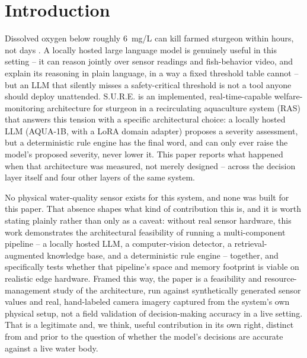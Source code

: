 \section{Introduction}
\label{sec:introduction}

Dissolved oxygen below roughly 6~mg/L can kill farmed sturgeon within hours, not days
\citep{lindholm2023waterquality,agmrc2026waterquality}. A locally hosted large language model is
genuinely useful in this setting -- it can reason jointly over sensor readings and fish-behavior
video, and explain its reasoning in plain language, in a way a fixed threshold table cannot -- but
an LLM that silently misses a safety-critical threshold is not a tool anyone should deploy
unattended. S.U.R.E. is an implemented, real-time-capable welfare-monitoring architecture for
sturgeon in a recirculating aquaculture system (RAS) that answers this tension with a specific
architectural choice: a locally hosted LLM (AQUA-1B, with a LoRA domain adapter) proposes a severity
assessment, but a deterministic rule engine has the final word, and can only ever raise the model's
proposed severity, never lower it. This paper reports what happened when that architecture was
measured, not merely designed -- across the decision layer itself and four other layers of the same
system.

No physical water-quality sensor exists for this system, and none was built for this paper. That
absence shapes what kind of contribution this is, and it is worth stating plainly rather than only
as a caveat: without real sensor hardware, this work demonstrates the architectural feasibility of
running a multi-component pipeline -- a locally hosted LLM, a computer-vision detector, a
retrieval-augmented knowledge base, and a deterministic rule engine -- together, and specifically
tests whether that pipeline's space and memory footprint is viable on realistic edge hardware. Framed
this way, the paper is a feasibility and resource-management study of the architecture, run against
synthetically generated sensor values and real, hand-labeled camera imagery captured from the
system's own physical setup, not a field validation of decision-making accuracy in a live setting.
That is a legitimate and, we think, useful contribution in its own right, distinct from and prior to
the question of whether the model's decisions are accurate against a live water body.


